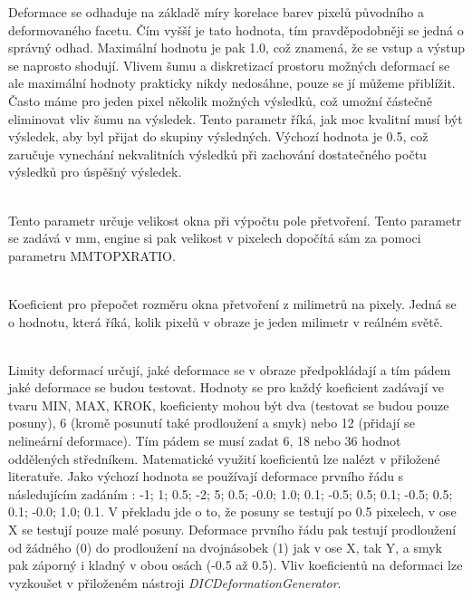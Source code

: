 \documentclass[a4paper,12pt]{article}
\begin{document}
\begin{description}
Deformace se odhaduje na základě míry korelace barev pixelů původního a deformovaného facetu. Čím vyšší je tato hodnota, tím pravděpodobněji se jedná o správný odhad. Maximální hodnotu je pak 1.0, což znamená, že se vstup a výstup se naprosto shodují. Vlivem šumu a diskretizací prostoru možných deformací se ale maximální hodnoty prakticky nikdy nedosáhne, pouze se jí můžeme přiblížit. Často máme pro jeden pixel několik možných výsledků, což umožní částečně eliminovat vliv šumu na výsledek. Tento parametr říká, jak moc kvalitní musí být výsledek, aby byl přijat do skupiny výsledných. Výchozí hodnota je 0.5, což zaručuje vynechání nekvalitních výsledků při zachování dostatečného počtu výsledků pro úspěšný výsledek. 
\item[STRAIN\textunderscore ESTIMATION\textunderscore PARAM] [double]\\
Tento parametr určuje velikost okna při výpočtu pole přetvoření. Tento parametr se zadává v mm, engine si pak velikost v pixelech dopočítá sám za pomoci parametru MM\textunderscore TO\textunderscore PX\textunderscore RATIO.
\item[MM\textunderscore TO\textunderscore PX\textunderscore RATIO] [double]\\
Koeficient pro přepočet rozměru okna přetvoření z milimetrů na pixely. Jedná se o hodnotu, která říká, kolik pixelů v obraze je jeden milimetr v reálném světě.
\item[DEFORMATION\textunderscore LIMITS] [double ; double ; double...]\\
Limity deformací určují, jaké deformace se v obraze předpokládají a tím pádem jaké deformace se budou testovat. Hodnoty se pro každý koeficient zadávají ve tvaru MIN, MAX, KROK, koeficienty mohou být dva (testovat se budou pouze posuny), 6 (kromě posunutí také prodloužení a smyk) nebo 12 (přidají se nelineární deformace). Tím pádem se musí zadat 6, 18 nebo 36 hodnot oddělených středníkem. Matematické využití koeficientů lze nalézt v přiložené literatuře. Jako výchozí hodnota se používají deformace prvního řádu s následujícím zadáním : -1; 1; 0.5; -2; 5; 0.5; -0.0; 1.0; 0.1; -0.5; 0.5; 0.1; -0.5; 0.5; 0.1; -0.0; 1.0; 0.1. V překladu jde o to, že posuny se testují po 0.5 pixelech, v ose X se testují pouze malé posuny. Deformace prvního řádu pak testují prodloužení od žádného (0) do prodloužení na dvojnásobek (1) jak v ose X, tak Y, a smyk pak záporný i kladný v obou osách (-0.5 až 0.5). Vliv koeficientů na deformaci lze vyzkoušet v přiloženém nástroji \emph{DIC\textunderscore DeformationGenerator}.
\end{description}
\newpage
\end{document}
